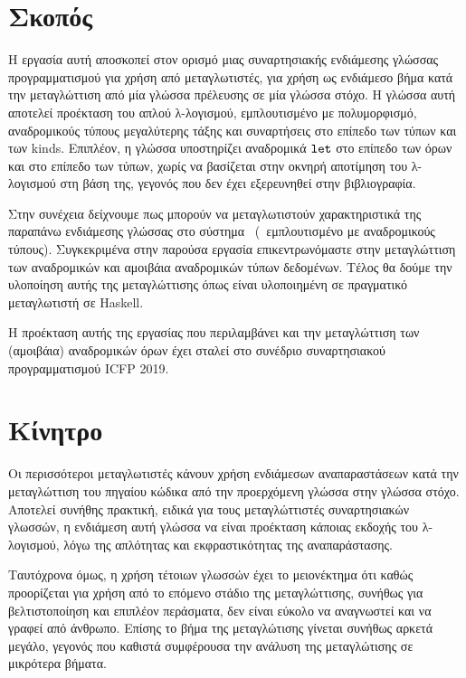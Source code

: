\section{Σκοπός}

Η εργασία αυτή αποσκοπεί στον ορισμό μιας συναρτησιακής ενδιάμεσης γλώσσας προγραμματισμού για 
χρήση από μεταγλωτιστές, για χρήση ως ενδιάμεσο βήμα κατά την μεταγλώττιση από μία γλώσσα πρέλευσης
σε μία γλώσσα στόχο. Η γλώσσα αυτή αποτελεί προέκταση του απλού λ-λογισμού, εμπλουτισμένο με πολυμορφισμό, αναδρομικούς τύπους μεγαλύτερης τάξης και συναρτήσεις στο επίπεδο των τύπων και των 
kinds. Επιπλέον, η γλώσσα υποστηρίζει αναδρομικά $\operatorname{\texttt{let}}$ στο επίπεδο των όρων και στο επίπεδο των τύπων, χωρίς να βασίζεται στην οκνηρή αποτίμηση του λ-λογισμού στη βάση της, 
  γεγονός που δεν έχει εξερευνηθεί στην βιβλιογραφία. 

  Στην συνέχεια δείχνουμε πως μπορούν να μεταγλωτιστούν χαρακτηριστικά της παραπάνω ενδιάμεσης 
  γλώσσας στο σύστημα \FOMF ~(\FOM ~εμπλουτισμένο με αναδρομικούς τύπους). Συγκεκριμένα στην 
  παρούσα εργασία επικεντρωνόμαστε στην μεταγλώττιση των αναδρομικών και αμοιβάια αναδρομικών τύπων
  δεδομένων. Τέλος θα δούμε την υλοποίηση αυτής της μεταγλώττισης όπως είναι υλοποιημένη σε πραγματικό 
  μεταγλωτιστή σε Haskell.

  Η προέκταση αυτής της εργασίας που περιλαμβάνει και την μεταγλώττιση των (αμοιβάια) αναδρομικών όρων
  έχει σταλεί στο συνέδριο συναρτησιακού προγραμματισμού ICFP 2019.

  \section{Κίνητρο}

  Οι περισσότεροι μεταγλωτιστές κάνουν χρήση ενδιάμεσων αναπαραστάσεων κατά την μεταγλώττιση του
  πηγαίου κώδικα από την προερχόμενη γλώσσα στην γλώσσα στόχο. Αποτελεί συνήθης πρακτική, ειδικά για
  τους μεταγλώττιστές συναρτησιακών γλωσσών, η ενδιάμεση αυτή γλώσσα να είναι προέκταση κάποιας
  εκδοχής του λ-λογισμού, λόγω της απλότητας και εκφραστικότητας της αναπαράστασης. 

  Ταυτόχρονα όμως, η χρήση τέτοιων γλωσσών έχει το μειονέκτημα ότι καθώς προορίζεται για χρήση από το
  επόμενο στάδιο της μεταγλώττισης, συνήθως για βελτιστοποίηση και επιπλέον περάσματα, δεν είναι εύκολο
  να αναγνωστεί και να γραφεί από άνθρωπο. Επίσης το βήμα της μεταγλώτισης γίνεται συνήθως αρκετά
  μεγάλο, γεγονός που καθιστά συμφέρουσα την ανάλυση της μεταγλώτισης σε μικρότερα βήματα.

